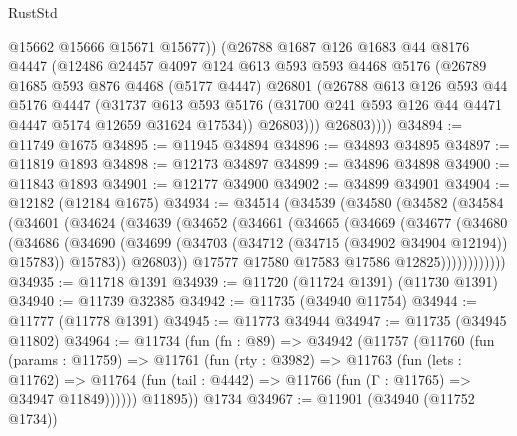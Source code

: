 \begin{lexlean}{RustStd}
\begin{coremodule}
              @15662
              @15666
              @15671
              @15677))
          (@26788
            @1687
            @126
            @1683
            @44
            @8176
            @4447
            (@12486
              @24457
              @4097
              @124
              @613
              @593
              @593
              @4468
              @5176
              (@26789
                @1685
                @593
                @876
                @4468
                (@5177 @4447)
                @26801
                (@26788
                  @613
                  @126
                  @593
                  @44
                  @5176
                  @4447
                  (@31737
                    @613
                    @593
                    @5176
                    (@31700 @241 @593 @126 @44 @4471 @4447 @5174 @12659 @31624 @17534))
                  @26803)))
            @26803))))
@34894 := @11749 @1675
@34895 := @11945 @34894
@34896 := @34893 @34895
@34897 := @11819 @1893
@34898 := @12173 @34897
@34899 := @34896 @34898
@34900 := @11843 @1893
@34901 := @12177 @34900
@34902 := @34899 @34901
@34904 := @12182 (@12184 @1675)
@34934 := @34514
    (@34539
      (@34580
        (@34582
          (@34584
            (@34601
              (@34624
                (@34639
                  (@34652
                    (@34661
                      (@34665
                        (@34669
                          (@34677
                            (@34680
                              (@34686
                                (@34690
                                  (@34699
                                    (@34703 (@34712 (@34715 (@34902 @34904 @12194)) @15783))
                                    @15783))
                                @26803))
                            @17577
                            @17580
                            @17583
                            @17586
                            @12825))))))))))))
@34935 := @11718 @1391
@34939 := @11720 (@11724 @1391) (@11730 @1391)
@34940 := @11739 @32385
@34942 := @11735 (@34940 @11754)
@34944 := @11777 (@11778 @1391)
@34945 := @11773 @34944
@34947 := @11735 (@34945 @11802)
@34964 := @11734
    (fun (fn : @89) =>
    @34942
      (@11757
        (@11760
          (fun (params : @11759) =>
          @11761
            (fun (rty : @3982) =>
            @11763
              (fun (lets : @11762) =>
              @11764 (fun (tail : @4442) => @11766 (fun (Γ : @11765) => @34947 @11849))))))
        @11895))
    @1734
@34967 := @11901 (@34940 (@11752 @1734))

\end{coremodule}
\end{lexlean}
